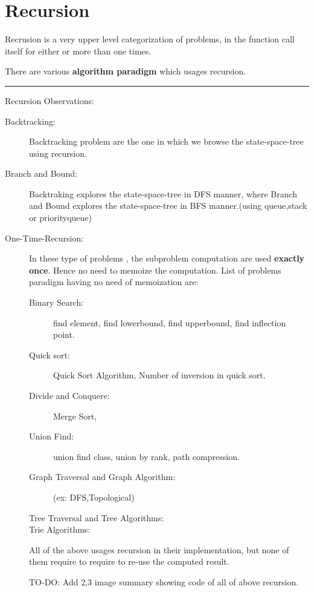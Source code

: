 \chapter{Recursion}\label{ch:recursion}

Recrusion is a very upper level categorization of problems, in the function call itself for either or more than one times.


There are various \textbf{algorithm paradigm} which usages recursion.

\rule{\textwidth}{1.5pt}
Recursion Observations:
\begin{description}
    \item [Backtracking:] Backtracking problem are the one in which we browse the state-space-tree using recursion.
    \item [Branch and Bound:] Backtraking explores the state-space-tree in DFS manner, where Branch and Bound explores the state-space-tree in BFS manner.(using queue,stack or priorityqueue)
    
    \item [One-Time-Recursion:] In these type of problems , the subproblem computation are used \textbf{exactly once}. Hence no need to memoize the computation.
    List of problems paradigm having no need of memoization are:
    \begin{description}
        \item [Binary Search:] find element, find lowerbound, find upperbound, find inflection point.
        \item [Quick sort:] Quick Sort Algorithm, Number of inversion in quick sort.
        \item [Divide and Conquere:] Merge Sort, 
        \item [Union Find:] union find class, union by rank, path compression.
        \item [Graph Traversal and Graph Algorithm:] (ex: DFS,Topological)
        \item [Tree Traversal and Tree Algorithms:]
        \item [Trie Algorithms:]
    \end{description}

    All of the above usages recursion in their implementation, but none of them require to require to re-use the computed result.

    TO-DO: Add 2,3 image summary showing code of all of above recursion.


\end{description}
